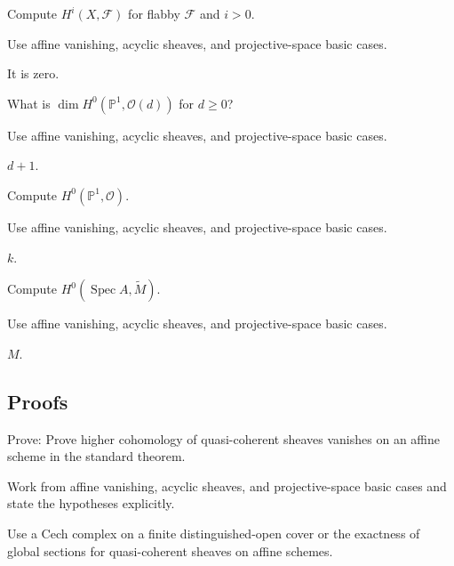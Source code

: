 \begin{exercise}\label{exr:vi49-expand-02}
Compute $H^i(X,\mathcal F)$ for flabby $\mathcal F$ and $i>0$.
\end{exercise}
\begin{hint}
Use affine vanishing, acyclic sheaves, and projective-space basic cases.
\end{hint}
\begin{solution}
It is zero.
\end{solution}

\begin{exercise}\label{exr:vi49-expand-03}
What is $\dim H^0(\mathbb P^1,\mathcal O(d))$ for $d\ge0$?
\end{exercise}
\begin{hint}
Use affine vanishing, acyclic sheaves, and projective-space basic cases.
\end{hint}
\begin{solution}
$d+1$.
\end{solution}

\begin{exercise}[O global]\label{exr:vi49-expand-04}
Compute $H^0(\mathbb P^1,\mathcal O)$.
\end{exercise}
\begin{hint}
Use affine vanishing, acyclic sheaves, and projective-space basic cases.
\end{hint}
\begin{solution}
$k$.
\end{solution}

\begin{exercise}[Affine H0]\label{exr:vi49-expand-05}
Compute $H^0(\operatorname{Spec}A,\widetilde M)$.
\end{exercise}
\begin{hint}
Use affine vanishing, acyclic sheaves, and projective-space basic cases.
\end{hint}
\begin{solution}
$M$.
\end{solution}

\subsection*{Proofs}

\begin{exercise}\label{exr:vi49-expand-06}
Prove: Prove higher cohomology of quasi-coherent sheaves vanishes on an affine scheme in the standard theorem.
\end{exercise}
\begin{hint}
Work from affine vanishing, acyclic sheaves, and projective-space basic cases and state the hypotheses explicitly.
\end{hint}
\begin{solution}
Use a Cech complex on a finite distinguished-open cover or the exactness of global sections for quasi-coherent sheaves on affine schemes.
\end{solution}

